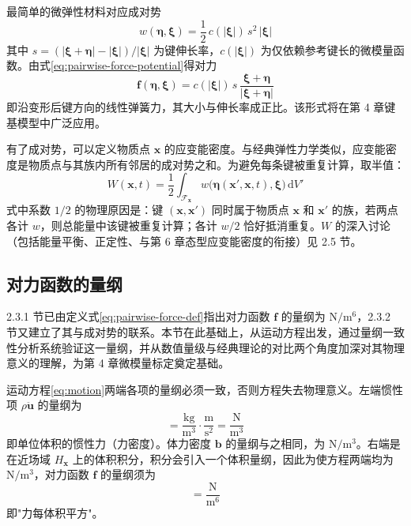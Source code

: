 \begin{example}[线性微弹性材料]
  最简单的微弹性材料对应成对势
  \begin{equation}
    w(\boldsymbol{\eta},\boldsymbol{\xi}) = \frac{1}{2}\,c(|\boldsymbol{\xi}|)\,s^{2}\,|\boldsymbol{\xi}|
    \label{eq:linear-potential}
  \end{equation}
  其中 $s=(|\boldsymbol{\xi}+\boldsymbol{\eta}|-|\boldsymbol{\xi}|)/|\boldsymbol{\xi}|$ 为键伸长率，$c(|\boldsymbol{\xi}|)$ 为仅依赖参考键长的微模量函数。由式\eqref{eq:pairwise-force-potential}得对力
  \begin{equation}
    \mathbf{f}(\boldsymbol{\eta},\boldsymbol{\xi}) = c(|\boldsymbol{\xi}|)\,s\,\frac{\boldsymbol{\xi}+\boldsymbol{\eta}}{|\boldsymbol{\xi}+\boldsymbol{\eta}|}
    \label{eq:linear-microelastic-force}
  \end{equation}
  即沿变形后键方向的线性弹簧力，其大小与伸长率成正比。该形式将在第 4 章键基模型中广泛应用。
\end{example}

有了成对势，可以定义物质点 $\mathbf{x}$ 的应变能密度。与经典弹性力学类似，应变能密度是物质点与其族内所有邻居的成对势之和。为避免每条键被重复计算，取半值：
\begin{equation}
  W(\mathbf{x},t)=\frac{1}{2}\int_{\mathcal{F}_{\mathbf{x}}} w\bigl(\boldsymbol{\eta}(\mathbf{x}',\mathbf{x},t),\boldsymbol{\xi}\bigr)\,\mathrm{d}V'
  \label{eq:strain-energy}
\end{equation}
式中系数 $1/2$ 的物理原因是：键 $(\mathbf{x},\mathbf{x}')$ 同时属于物质点 $\mathbf{x}$ 和 $\mathbf{x}'$ 的族，若两点各计 $w$，则总能量中该键被重复计算；各计 $w/2$ 恰好抵消重复。$W$ 的深入讨论（包括能量平衡、正定性、与第 6 章态型应变能密度的衔接）见 2.5 节。

\subsection{对力函数的量纲}

2.3.1 节已由定义式\eqref{eq:pairwise-force-def}指出对力函数 $\mathbf{f}$ 的量纲为 $\mathrm{N}/\mathrm{m}^{6}$，2.3.2 节又建立了其与成对势的联系。本节在此基础上，从运动方程出发，通过量纲一致性分析系统验证这一量纲，并从数值量级与经典理论的对比两个角度加深对其物理意义的理解，为第 4 章微模量标定奠定基础。

运动方程\eqref{eq:motion}两端各项的量纲必须一致，否则方程失去物理意义。左端惯性项 $\rho\ddot{\mathbf{u}}$ 的量纲为
\begin{equation}
  [\rho\ddot{\mathbf{u}}]=\frac{\mathrm{kg}}{\mathrm{m}^{3}}\cdot\frac{\mathrm{m}}{\mathrm{s}^{2}}=\frac{\mathrm{N}}{\mathrm{m}^{3}}
  \label{eq:dim-inertia}
\end{equation}
即单位体积的惯性力（力密度）。体力密度 $\mathbf{b}$ 的量纲与之相同，为 $\mathrm{N}/\mathrm{m}^{3}$。右端是在近场域 $H_{\mathbf{x}}$ 上的体积积分，积分会引入一个体积量纲，因此为使方程两端均为 $\mathrm{N}/\mathrm{m}^{3}$，对力函数 $\mathbf{f}$ 的量纲须为
\begin{equation}
  [\mathbf{f}]=\frac{\mathrm{N}}{\mathrm{m}^{6}}
  \label{eq:dim-force}
\end{equation}
即"力每体积平方"。

